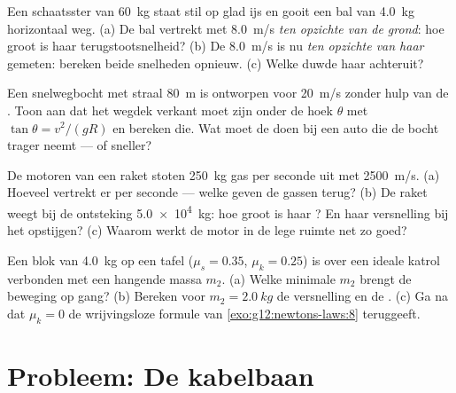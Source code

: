 \begin{exercise}[$\star\star\star$]\label{exo:g12:newtons-laws:12}
Een schaatsster van \qty{60}{kg} staat stil op glad ijs en gooit een bal van
\qty{4.0}{kg} horizontaal weg. (a) De bal vertrekt met \qty{8.0}{m/s} \emph{ten
opzichte van de grond}: hoe groot is haar terugstootsnelheid? (b) De \qty{8.0}{m/s}
is nu \emph{ten opzichte van haar} gemeten: bereken beide snelheden opnieuw.
(c) Welke  duwde haar achteruit?
\end{exercise}

\begin{exercise}[$\star\star\star$]\label{exo:g12:newtons-laws:13}
Een snelwegbocht met straal \qty{80}{m} is ontworpen voor \qty{20}{m/s} zonder hulp
van de . Toon aan dat het wegdek verkant moet zijn onder de hoek $\theta$ met
$\tan\theta = v^2/(gR)$ en bereken die. Wat moet de  doen bij een auto die de
bocht trager neemt --- of sneller?
\end{exercise}

\begin{exercise}[$\star\star\star$]\label{exo:g12:newtons-laws:14}
De motoren van een raket stoten \qty{250}{kg} gas per seconde uit met
\qty{2500}{m/s}. (a) Hoeveel  vertrekt er per seconde --- welke 
geven de gassen terug? (b) De raket weegt bij de ontsteking \qty{5.0e4}{kg}: hoe
groot is haar ? En haar versnelling bij het opstijgen? (c) Waarom werkt de
motor in de lege ruimte net zo goed?
\end{exercise}

\begin{exercise}[$\star\star\star$]\label{exo:g12:newtons-laws:15}
Een blok van \qty{4.0}{kg} op een tafel ($\mu_s = 0.35$, $\mu_k = 0.25$) is over een
ideale katrol verbonden met een hangende massa $m_2$. (a) Welke minimale $m_2$ brengt
de beweging op gang? (b) Bereken voor $m_2 = \qty{2.0}{kg}$ de versnelling en de
. (c) Ga na dat $\mu_k = 0$ de wrijvingsloze formule van
\cref{exo:g12:newtons-laws:8} teruggeeft.
\end{exercise}

\section{Probleem: De kabelbaan}

